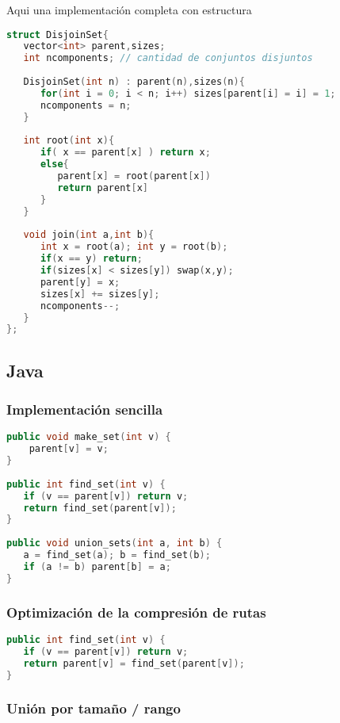 Aqui una implementación completa con estructura

\begin{lstlisting}[language=C++]
struct DisjoinSet{
   vector<int> parent,sizes;
   int ncomponents; // cantidad de conjuntos disjuntos
   
   DisjoinSet(int n) : parent(n),sizes(n){
      for(int i = 0; i < n; i++) sizes[parent[i] = i] = 1;
      ncomponents = n;
   }
	
   int root(int x){
      if( x == parent[x] ) return x;
      else{
         parent[x] = root(parent[x])
         return parent[x]
      }
   }
	
   void join(int a,int b){
      int x = root(a); int y = root(b);
      if(x == y) return;
      if(sizes[x] < sizes[y]) swap(x,y);
      parent[y] = x;
      sizes[x] += sizes[y];
      ncomponents--;
   }
};
\end{lstlisting}

\subsection{Java}

\subsubsection{Implementación sencilla}

\begin{lstlisting}[language=C++]
public void make_set(int v) {
    parent[v] = v;
}
	
public int find_set(int v) {
   if (v == parent[v]) return v;
   return find_set(parent[v]);
}
	
public void union_sets(int a, int b) {
   a = find_set(a); b = find_set(b);
   if (a != b) parent[b] = a;
}
\end{lstlisting}

\subsubsection{Optimización de la compresión de rutas}

\begin{lstlisting}[language=C++]
public int find_set(int v) {
   if (v == parent[v]) return v;
   return parent[v] = find_set(parent[v]);
}
\end{lstlisting}

\subsubsection{Unión por tamaño / rango}

